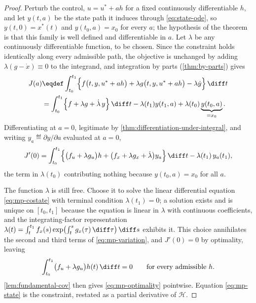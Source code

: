 \begin{proof}
	Perturb the control, $u=u^{\ast}+ah$ for a fixed continuously differentiable
	$h$, and let $y(t,a)$ be the state path it induces through
	\eqref{eq:state-ode}, so $y(t,0)=x^{\ast}(t)$ and $y(t_0,a)=x_0$ for every $a$;
	the hypothesis of the theorem is that this family is well defined and
	differentiable in $a$. Let $\lambda$ be any continuously differentiable
	function, to be chosen. Since
	the constraint holds identically along every admissible path, the objective is
	unchanged by adding $\lambda(g-\dot x)\equiv0$ to the integrand, and
	integration by parts (\autoref{thm:by-parts}) gives
	\begin{align*}
		J(a) & \eqdef\int_{t_0}^{t_1}
		\Bigl\{f\bigl(t,y,u^{\ast}+ah\bigr)
		+\lambda g\bigl(t,y,u^{\ast}+ah\bigr)-\lambda\dot y\Bigr\}\,\diff t                        \\
		     & =\int_{t_0}^{t_1}\Bigl\{f+\lambda g+\dot\lambda\,y\Bigr\}\,\diff t
		-\lambda(t_1)y(t_1,a)+\lambda(t_0)\underbrace{y(t_0,a)}_{=x_0} .
	\end{align*}
	Differentiating at $a=0$, legitimate by
	\autoref{thm:differentiation-under-integral}, and writing
	$y_a\eqdef\partial y/\partial a$ evaluated at $a=0$,
	\begin{equation}\label{eq:mp-variation}
		J'(0)=\int_{t_0}^{t_1}
		\Bigl\{\bigl(f_u+\lambda g_u\bigr)h
		+\bigl(f_x+\lambda g_x+\dot\lambda\bigr)y_a\Bigr\}\,\diff t
		-\lambda(t_1)\,y_a(t_1),
	\end{equation}
	the term in $\lambda(t_0)$ contributing nothing because $y(t_0,a)=x_0$ for all
	$a$.

	The function $\lambda$ is still free. Choose it to solve the linear differential
	equation \eqref{eq:mp-costate} with terminal condition $\lambda(t_1)=0$; a
	solution exists and is unique on $[t_0,t_1]$ because the equation is linear in
	$\lambda$ with continuous coefficients, and the integrating-factor
	representation
	$\lambda(t)=\int_{t}^{t_1}f_x(s)\exp\bigl(\int_{t}^{s}g_x(\tau)\,\diff\tau\bigr)\,\diff s$
	exhibits it. This choice annihilates the second and third terms of
	\eqref{eq:mp-variation}, and $J'(0)=0$ by optimality, leaving
	\[
		\int_{t_0}^{t_1}\bigl(f_u+\lambda g_u\bigr)h(t)\,\diff t=0
		\qquad\text{for every admissible }h .
	\]
	\autoref{lem:fundamental-cov} then gives \eqref{eq:mp-optimality} pointwise.
	Equation \eqref{eq:mp-state} is the constraint, restated as a partial derivative
	of $\mathcal{H}$.
\end{proof}

